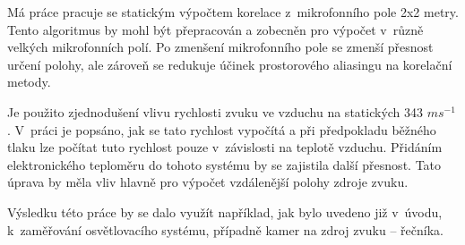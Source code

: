 Má práce pracuje se statickým výpočtem korelace z~mikrofonního pole 2x2 metry. Tento algoritmus by mohl být přepracován a zobecněn pro výpočet v~různě velkých mikrofonních polí. Po zmenšení mikrofonního pole se zmenší přesnost určení polohy, ale zároveň se redukuje účinek prostorového aliasingu na korelační metody.

Je použito zjednodušení vlivu rychlosti zvuku ve vzduchu na statických 343 $ms^{-1}$. V~práci je popsáno, jak se tato rychlost vypočítá a při předpokladu běžného tlaku lze počítat tuto rychlost pouze v~závislosti na teplotě vzduchu. Přidáním elektronického teploměru do tohoto systému by se zajistila další přesnost. Tato úprava by měla vliv hlavně pro výpočet vzdálenější polohy zdroje zvuku.

Výsledku této práce by se dalo využít například, jak bylo uvedeno již v~úvodu, k~zaměřování osvětlovacího systému, případně kamer na zdroj zvuku – řečníka.
